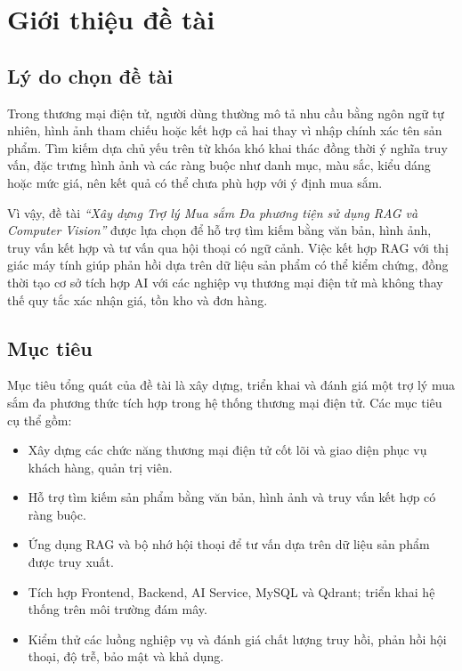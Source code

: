 
\section{Giới thiệu đề tài}

\subsection{Lý do chọn đề tài}
\indent Trong thương mại điện tử, người dùng thường mô tả nhu cầu bằng ngôn ngữ tự nhiên, hình ảnh tham chiếu hoặc kết hợp cả hai thay vì nhập chính xác tên sản phẩm. Tìm kiếm dựa chủ yếu trên từ khóa khó khai thác đồng thời ý nghĩa truy vấn, đặc trưng hình ảnh và các ràng buộc như danh mục, màu sắc, kiểu dáng hoặc mức giá, nên kết quả có thể chưa phù hợp với ý định mua sắm.

\indent Vì vậy, đề tài \textit{\enquote{Xây dựng Trợ lý Mua sắm Đa phương tiện sử dụng RAG và Computer Vision}} được lựa chọn để hỗ trợ tìm kiếm bằng văn bản, hình ảnh, truy vấn kết hợp và tư vấn qua hội thoại có ngữ cảnh. Việc kết hợp RAG với thị giác máy tính giúp phản hồi dựa trên dữ liệu sản phẩm có thể kiểm chứng, đồng thời tạo cơ sở tích hợp AI với các nghiệp vụ thương mại điện tử mà không thay thế quy tắc xác nhận giá, tồn kho và đơn hàng.

\subsection{Mục tiêu}
\indent Mục tiêu tổng quát của đề tài là xây dựng, triển khai và đánh giá một trợ lý mua sắm đa phương thức tích hợp trong hệ thống thương mại điện tử. Các mục tiêu cụ thể gồm:
\begin{itemize}
    \item Xây dựng các chức năng thương mại điện tử cốt lõi và giao diện phục vụ khách hàng, quản trị viên.
    \item Hỗ trợ tìm kiếm sản phẩm bằng văn bản, hình ảnh và truy vấn kết hợp có ràng buộc.
    \item Ứng dụng RAG và bộ nhớ hội thoại để tư vấn dựa trên dữ liệu sản phẩm được truy xuất.
    \item Tích hợp Frontend, Backend, AI Service, MySQL và Qdrant; triển khai hệ thống trên môi trường đám mây.
    \item Kiểm thử các luồng nghiệp vụ và đánh giá chất lượng truy hồi, phản hồi hội thoại, độ trễ, bảo mật và khả dụng.
\end{itemize}

